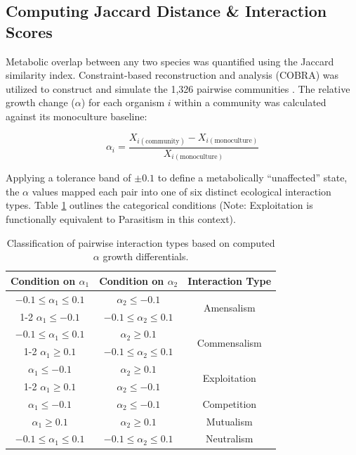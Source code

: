 \documentclass[11pt, a4paper]{article}
\begin{document}
\subsection{Computing Jaccard Distance \& Interaction Scores}
Metabolic overlap between any two species was quantified using the Jaccard similarity index. Constraint-based reconstruction and analysis (COBRA) was utilized to construct and simulate the 1,326 pairwise communities \cite{3}. The relative growth change ($\alpha$) for each organism $i$ within a community was calculated against its monoculture baseline:

\begin{equation}
\alpha_i = \frac{X_{i(\text{community})} - X_{i(\text{monoculture})}}{X_{i(\text{monoculture})}}
\end{equation}

Applying a tolerance band of $\pm0.1$ to define a metabolically ``unaffected'' state, the $\alpha$ values mapped each pair into one of six distinct ecological interaction types. Table \ref{tab:interaction_classification} outlines the categorical conditions (Note: Exploitation is functionally equivalent to Parasitism in this context).

\begin{table}[htbp]
    \centering
    \renewcommand{\arraystretch}{1.3} 
    \begin{tabular}{|c|c|c|}
        \hline
        \textbf{Condition on $\alpha_1$} & \textbf{Condition on $\alpha_2$} & \textbf{Interaction Type} \\
        \hline
        $-0.1 \le \alpha_1 \le 0.1$ & $\alpha_2 \le -0.1$ & \multirow{2}{*}{Amensalism} \\ \cline{1-2}
        $\alpha_1 \le -0.1$ & $-0.1 \le \alpha_2 \le 0.1$ & \\
        \hline
        $-0.1 \le \alpha_1 \le 0.1$ & $\alpha_2 \ge 0.1$ & \multirow{2}{*}{Commensalism} \\ \cline{1-2}
        $\alpha_1 \ge 0.1$ & $-0.1 \le \alpha_2 \le 0.1$ & \\
        \hline
        $\alpha_1 \le -0.1$ & $\alpha_2 \ge 0.1$ & \multirow{2}{*}{Exploitation} \\ \cline{1-2}
        $\alpha_1 \ge 0.1$ & $\alpha_2 \le -0.1$ & \\
        \hline
        $\alpha_1 \le -0.1$ & $\alpha_2 \le -0.1$ & Competition \\
        \hline
        $\alpha_1 \ge 0.1$ & $\alpha_2 \ge 0.1$ & Mutualism \\
        \hline
        $-0.1 \le \alpha_1 \le 0.1$ & $-0.1 \le \alpha_2 \le 0.1$ & Neutralism \\
        \hline
    \end{tabular}
    \vspace{0.2cm}
    \caption{Classification of pairwise interaction types based on computed $\alpha$ growth differentials.}
    \label{tab:interaction_classification}
\end{table}
\end{document}
